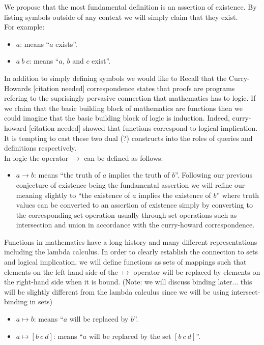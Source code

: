 \documentclass[11pt]{article}
\begin{document}
We propose that the most fundamental definition is an assertion of existence. By listing symbols outside of any context we will simply claim that they exist.\\
For example:
\begin{itemize}
\item $a$: means ``$a$ exists''.
\item $a\ b\ c$: means ``$a$, $b$ and $c$ exist''.
\end{itemize}

In addition to simply defining symbols we would like to 
Recall that the Curry-Howards [citation needed] correspondence states that proofs are programs refering to the suprisingly pervasive connection that mathematics has to logic.
If we claim that the basic building block of mathematics are functions then we could imagine that the basic building block of logic is induction.
Indeed, curry-howard [citation needed] showed that functions correspond to logical implication. 
It is tempting to cast these two dual (?) constructs into the roles of queries and definitions respectively.\\

In logic the operator $\rightarrow$ can be defined as follows:
\begin{itemize}
\item $a \rightarrow b$: means ``the truth of $a$ implies the truth of $b$''. 
Following our previous conjecture of existence being the fundamental assertion we will refine our meaning slightly to ``the existence of $a$ implies the existence of $b$'' where truth values 
can be converted to an assertion of existence simply by converting to the corresponding set operation usually through set operations such as intersection and union in accordance with the curry-howard correspondence.
\end{itemize}

Functions in mathematics have a long history and many different representations including the lambda calculus.
In order to clearly establish the connection to sets and logical implication, we will define functions as sets of mappings such that elements on the left hand side of the 
$\mapsto$ operator will be replaced by elements on the right-hand side when it is bound. (Note: we will discuss binding later... this will be slightly different from the lambda calculus since we will be using intersect-binding in sets)

\begin{itemize}
\item $a \mapsto b$: means ``$a$ will be replaced by $b$''. 
\item $a \mapsto [b\ c\ d]$: means ``$a$ will be replaced by the set $[b\ c\ d]$''. 
\end{itemize}
\end{document}
